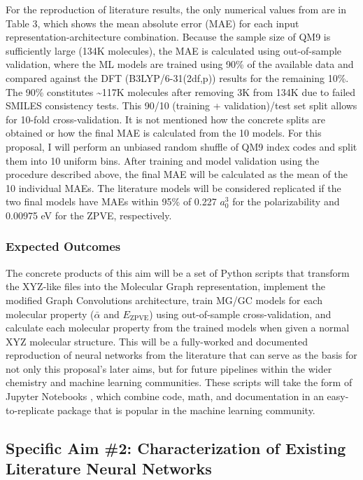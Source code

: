 \documentclass[12pt]{article}
\begin{document}
For the reproduction of literature results, the only numerical values from \parencite{2017arXiv170205532F} are in Table 3, which shows the mean absolute error (MAE) for each input representation-architecture combination. Because the sample size of QM9 is sufficiently large (134K molecules), the MAE is calculated using out-of-sample validation, where the ML models are trained using 90\% of the available data and compared against the DFT (B3LYP/6-31(2df,p)) results for the remaining 10\%. The 90\% constitutes \textasciitilde{}117K molecules after removing 3K from 134K due to failed SMILES consistency tests. This 90/10 (training + validation)/test set split allows for 10-fold cross-validation. It is not mentioned how the concrete splits are obtained or how the final MAE is calculated from the 10 models. For this proposal, I will perform an unbiased random shuffle of QM9 index codes and split them into 10 uniform bins. After training and model validation using the procedure described above, the final MAE will be calculated as the mean of the 10 individual MAEs. The literature models will be considered replicated if the two final models have MAEs within 95\% of 0.227 \(a_{0}^{3}\) for the polarizability and 0.00975 eV for the ZPVE, respectively.

\subsubsection{Expected Outcomes}
\label{sec:org7f9490b}

The concrete products of this aim will be a set of Python scripts that transform the XYZ-like files into the Molecular Graph representation, implement the modified Graph Convolutions architecture, train MG/GC models for each molecular property (\(\bar{\alpha}\) and \(E_\text{ZPVE}\)) using out-of-sample cross-validation, and calculate each molecular property from the trained models when given a normal XYZ molecular structure. This will be a fully-worked and documented reproduction of neural networks from the literature that can serve as the basis for not only this proposal's later aims, but for future pipelines within the wider chemistry and machine learning communities. These scripts will take the form of Jupyter Notebooks \cite{jupyter,PER-GRA:2007}, which combine code, math, and documentation in an easy-to-replicate package that is popular in the machine learning community.

\subsection{Specific Aim \#2: Characterization of Existing Literature Neural Networks}
\label{sec:orga28bef0}
\end{document}

